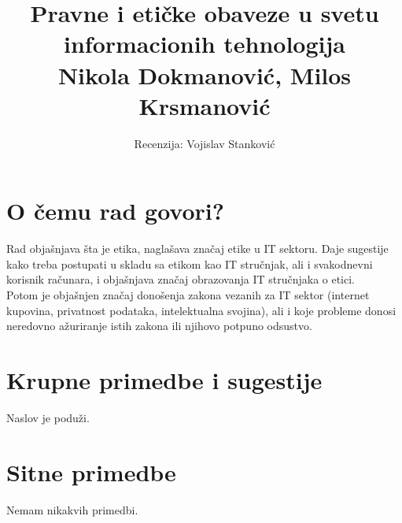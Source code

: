 \documentclass[a4paper]{article}
\begin{document}
\title{Pravne i etičke obaveze u svetu
informacionih tehnologija\\ \small{Nikola Dokmanović, Milos Krsmanović}}

\author{Recenzija: Vojislav Stanković}


\maketitle




\section{O čemu rad govori?}
Rad objašnjava šta je etika, naglašava značaj etike u IT sektoru. Daje sugestije kako treba postupati u skladu sa etikom kao IT stručnjak, ali i svakodnevni korisnik računara, i objašnjava značaj obrazovanja IT stručnjaka o etici.\\
Potom je objašnjen značaj donošenja zakona vezanih za IT sektor (internet kupovina, privatnost podataka, intelektualna svojina), ali i koje probleme donosi neredovno ažuriranje istih zakona ili njihovo potpuno odsustvo.

\section{Krupne primedbe i sugestije}
Naslov je poduži.

\section{Sitne primedbe}
Nemam nikakvih primedbi.
\end{document}
